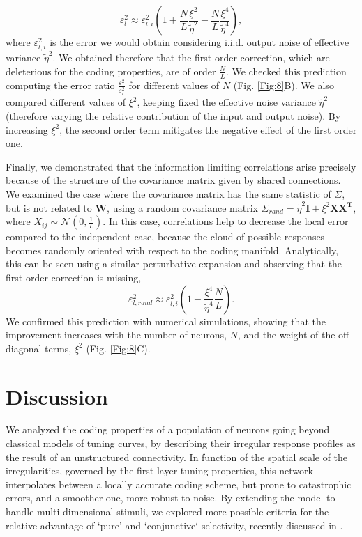\documentclass[a4paper]{article}
\begin{document}
\begin{equation}
\varepsilon_l^2 \approx \varepsilon_{l,i}^2 (1+\frac{ N}{L}\frac{\xi^2}{\tilde\eta^2 } - \frac{N}{L} \frac{\xi^4}{\tilde\eta^4}),
\label{Eq:IN}
\end{equation}where $\varepsilon_{l,i}^2$ is the error we would obtain considering i.i.d. output noise of effective variance $\tilde\eta^2$. We obtained therefore that the first order correction, which are deleterious for the coding properties, are of order $\frac{N}{L}$. We checked this prediction computing the error ratio $\frac{\varepsilon^2}{\varepsilon^2_{i}}$ for different values of $N$ (Fig. \ref{Fig:8}B). We also compared different values of $\xi^2$, keeping fixed the effective noise variance $\tilde \eta^2$ (therefore varying the relative contribution of the input and output noise). By increasing $\xi^2$, the second order term mitigates the negative effect of the first order one. 

Finally, we demonstrated that the information limiting correlations arise precisely because of the structure of the covariance matrix given by shared connections. We examined the case where the covariance matrix has the same statistic of $\Sigma$, but is not related to $\mathbf{W}$,  using a random covariance matrix $\Sigma_{rand} = \tilde\eta^2 \mathbf{I} + \xi^2 \mathbf{XX^T}$, where $X_{ij} \sim \mathcal{N}(0,\frac{1}{L})$. In this case, correlations help to decrease the local error compared to the independent case, because the cloud of possible responses becomes randomly oriented with respect to the coding manifold. Analytically, this can be seen using a similar perturbative expansion and observing that the first order correction is missing, 
\begin{equation}
\varepsilon_{l,rand}^2 \approx \varepsilon_{l,i}^2 (1  - \frac{\xi^4}{\tilde\eta^4}\frac{N}{L}).
\end{equation}We confirmed this prediction with numerical simulations, showing that the improvement increases with the number of neurons, $N$, and the weight of the off-diagonal terms, $\xi^2$ (Fig. \ref{Fig:8}C).  
\section{Discussion}
We analyzed the coding properties of a population of neurons going beyond classical models of tuning curves, by describing their irregular response profiles as the result of an unstructured connectivity.
In function of the  spatial scale of the irregularities, governed by the first layer tuning properties, this network interpolates between a locally accurate coding scheme, but prone to catastrophic errors, and a smoother one, more robust to noise. By extending the model to handle multi-dimensional stimuli, we explored more possible criteria for the relative advantage of `pure' and `conjunctive` selectivity, recently discussed in \cite{Finkelstein2018OptimalBats,Harel2020OptimalConstraints}.
\end{document}
